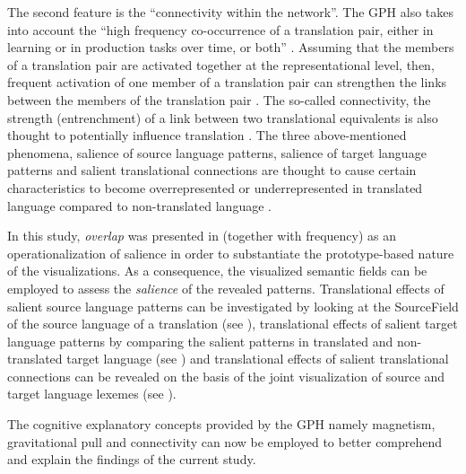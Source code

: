 The second feature is the “connectivity within the network”. The GPH also takes into account the “high frequency co-occurrence of a translation pair, either in learning or in production tasks over time, or both” \citep[14]{de_sutter_developing_2017}. Assuming that the members of a translation pair are activated together at the representational level, then, frequent activation of one member of a translation pair can strengthen the links between the members of the translation pair \citep[14]{de_sutter_developing_2017}. The so-called connectivity, the strength (entrenchment) of a link between two translational equivalents is also thought to potentially influence translation \citep[15]{de_sutter_developing_2017}. The three above-mentioned phenomena, salience of source language patterns, salience of target language patterns and salient translational connections are thought to cause certain characteristics to become overrepresented or underrepresented in translated language compared to non-translated language \citep{de_sutter_developing_2017}.

In this study, \textit{overlap} was presented in  (together with frequency) as an operationalization of salience in order to substantiate the prototype-based nature of the visualizations. As a consequence, the visualized semantic fields can be employed to assess the \textit{salience} of the revealed patterns. Translational effects of salient source language patterns can be investigated by looking at the SourceField of the source language of a translation (see ), translational effects of salient target language patterns by comparing the salient patterns in translated and non-translated target language (see ) and translational effects of salient translational connections can be revealed on the basis of the joint visualization of source and target language lexemes (see ).

The cognitive explanatory concepts provided by the GPH namely magnetism, gravitational pull and connectivity can now be employed to better comprehend and explain the findings of the current study.

